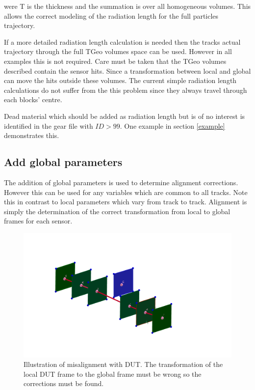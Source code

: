 were T is the thickness and the summation is over all homogeneous volumes.  This allows the correct modeling of the radiation length for the full particles trajectory. 

If a more detailed radiation length calculation is needed then the tracks actual trajectory through the full TGeo volumes space can be used. However in all examples this is not required. Care must be taken that the TGeo volumes described contain the sensor hits. Since a transformation between local and global can move the hits outside these volumes. The current simple radiation length calculations do not suffer from the this problem since they always travel through each blocks' centre.

Dead material which should be added as radiation length but is of no interest is identified in the gear file with $ID>99$. One example in section \ref{example} demonstrates this.



\subsection{Add global parameters}
\label{gloPar}
The addition of global parameters is used to determine alignment corrections. However this can be used for any variables which are common to all tracks. Note this in contrast to local parameters which vary from track to track.  Alignment is simply the determination of the correct transformation from local to global frames for each sensor. 

\begin{figure}[H]
\centering
\includegraphics[width=1.0\linewidth]{figures/MisAlignStraight.png}
\caption{Illustration of misalignment with DUT. The transformation of the local DUT frame to the global frame must be wrong so the corrections must be found.}
\label{fig:MisAlign}
\end{figure}

